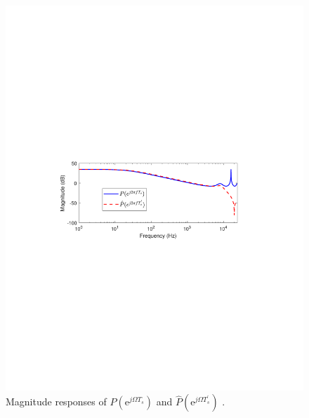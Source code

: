 \documentclass [11pt, proquest] {uwthesis}[2020/02/24]
\begin{document}
\begin{figure}[!ht]
\begin{centering}
\includegraphics[width=12cm]{Fractional-order-RC/P_Ts_P_Ts_prime}
\par\end{centering}
\caption{\label{fig:The-relationship-between-1}Magnitude responses of $P(\text{e}^{j\Omega T_{s}})$
and $\hat{P}(\text{e}^{j\Omega T_{s}^{'}})$ .}
\end{figure}
\end{document}
